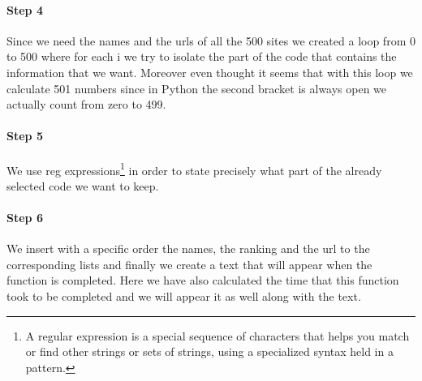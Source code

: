 \documentclass{article}
\begin{document}
\paragraph{Step 4} Since we need the names and the urls of all the 500 sites we created a loop from 0 to 500 where for each i we try to isolate the part of the code that contains the information that we want. Moreover even thought it seems that with this loop we calculate 501 numbers since in Python the second bracket is always open we actually count from zero to 499.
\paragraph{Step 5} We use reg expressions\footnote{A regular expression is a special sequence of characters that helps you match or find other strings or sets of strings, using a specialized syntax held in a pattern.} in order to state precisely what part of the already selected code we want to keep.
\paragraph{Step 6} We insert with a specific order the names, the ranking and the url to the corresponding lists and finally we create a text that will appear when the function is completed. Here we have also calculated the time that this function took to be completed and we will appear it as well along with the text.
\end{document}
